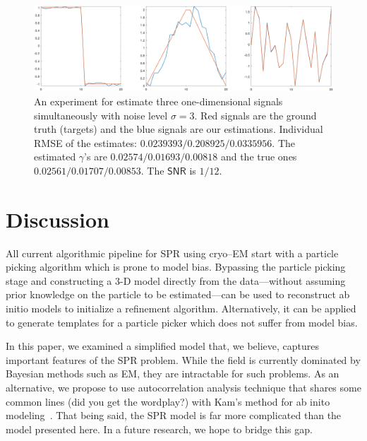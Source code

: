 \documentclass[english,11pt]{article}
\newcommand{\TODO}[1]{{\color{red}{[#1]}}}
\numberwithin{equation}{section}
\theoremstyle{plain}
\theoremstyle{definition}
\theoremstyle{remark}
\theoremstyle{plain}
\theoremstyle{remark}
\theoremstyle{plain}
\theoremstyle{plain}
\newcommand{\SNR}{{\textsf{SNR}}}
\begin{document}
\begin{figure}[t]
	\centering
	\includegraphics[width=\linewidth]{XP_1D_heterogeneous/hetero_example}
	\caption{An experiment for estimate three one-dimensional signals simultaneously with noise level $\sigma=3$. Red signals are the ground truth (targets) and the blue signals are our estimations. Individual RMSE of the estimates: $0.0239393 / 0.208925 / 0.0335956$. The estimated $\gamma$'s are $0.02574 / 0.01693 / 0.00818$ and the true ones $0.02561 / 0.01707 / 0.00853$. The $\SNR$ is $1/12$. \TODO{1. to replace with a ``progress'' plot 2. replace the triangle signal 3. add error progress figure}}
	\label{fig:1Dheterosignals}
\end{figure}



\section{Discussion}

All current algorithmic pipeline for SPR using cryo--EM start with a particle picking algorithm which is prone to model bias. 
Bypassing the particle picking stage and constructing a 3-D model directly from the data---without assuming prior knowledge on the particle to be estimated---can be used to reconstruct ab initio models to initialize a refinement algorithm.  Alternatively, it can be applied to generate templates for a particle picker which does not suffer from model bias.

In this paper, we examined a simplified model that, we believe, captures important features of the SPR problem. 
While the field is currently dominated by Bayesian methods such as EM, they are intractable for such problems. As an alternative, we propose to use autocorrelation analysis technique that shares some common lines (did you get the wordplay?)  with Kam's method for ab inito modeling~\cite{kam1980reconstruction,levin20173d,singer2018mathematics}. 
That being said, the SPR model is far more complicated than the model presented here. In a future research, we hope to bridge this gap.
\end{document}
